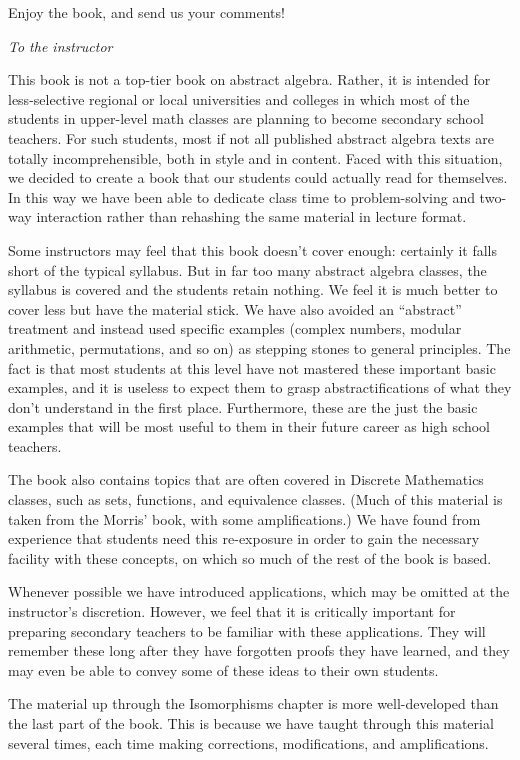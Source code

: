 Enjoy the book, and send us your comments!
\medskip

\noindent
\emph{To the instructor}
\smallskip

This book is not a top-tier book on abstract algebra. Rather, it is intended for less-selective regional or local universities and colleges in which most of the students in upper-level math classes are planning to become secondary school teachers. For such students, most if not all published abstract algebra texts are totally incomprehensible, both in style and in content. Faced with this situation, we decided to create a book that our students could actually read for themselves. In this way we have been able to dedicate class time to problem-solving and two-way interaction rather than rehashing the same material in lecture format.

Some instructors may feel that this book doesn’t cover enough: certainly it falls short of the typical syllabus. But in far too many abstract algebra classes, the syllabus is covered and the students retain nothing. We feel it is much better to cover less but have the material stick. We have also avoided an ``abstract'' treatment and instead used specific examples (complex numbers, modular arithmetic, permutations, and so on) as stepping stones to general principles. The fact is that most students at this level have not mastered these important basic examples, and it is useless to expect them to grasp abstractifications of what they don’t understand in the first place. Furthermore, these are the just the basic examples that will be most useful to them in their future career as high school teachers.

The book also contains topics that are often covered in Discrete Mathematics classes, such as sets, functions, and equivalence classes. (Much of this material is taken from the Morris' book, with some amplifications.) We have found from experience that students need this re-exposure in order to gain the necessary facility with these concepts, on which so much of the rest of the book is based.

Whenever possible we have introduced applications, which may be omitted at the instructor's discretion. However, we feel that it is critically important for preparing secondary teachers to be familiar with these applications. They will remember these long after they have forgotten proofs they have learned, and they may even be able to convey some of these ideas to their own students. 

The material up through the Isomorphisms chapter is more well-developed than the last part of the book. This is because we have taught through this material several times, each time making corrections, modifications, and amplifications.

